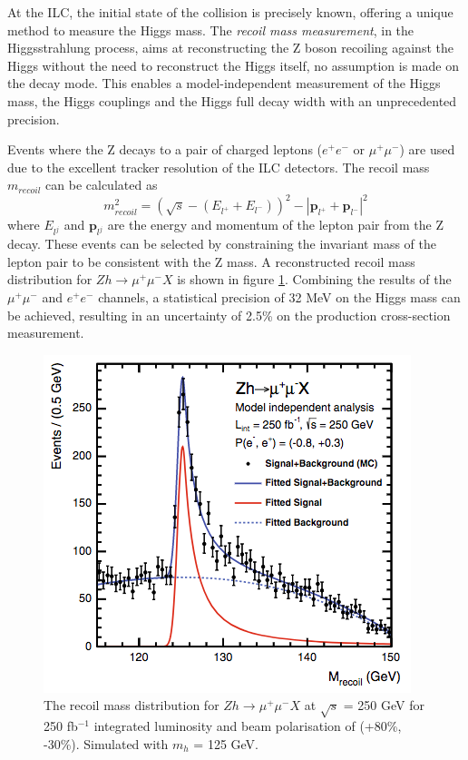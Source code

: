 At the ILC, the initial state of the collision is precisely known, offering a unique method to measure the Higgs mass. The \textit{recoil mass measurement}, in the Higgsstrahlung process, aims at reconstructing the Z boson recoiling against the Higgs without the need to reconstruct the Higgs itself, no assumption is made on the decay mode. This enables a model-independent measurement of the Higgs mass, the Higgs couplings and the Higgs full decay width with an unprecedented precision.

Events where the Z decays to a pair of charged leptons ($e^+e^-$ or $\mu^+ \mu^-$) are used due to the excellent tracker resolution of the ILC detectors. The recoil mass $m_{recoil}$ can be calculated as \cite{Yan:2016xyx}
\begin{equation}
  m_{recoil}^2 = (\sqrt{s} - (E_{l^+} + E_{l^-}))^2 -  |\textbf{p}_{l^+} + \textbf{p}_{l^-}|^2
\end{equation}
where $E_{l^j}$ and $\textbf{p}_{l^j}$ are the energy and momentum of the lepton pair from the Z decay. These events can be selected by constraining the invariant mass of the lepton pair to be consistent with the Z mass. A reconstructed recoil mass distribution for $Zh \rightarrow \mu^+\mu^-X$ is shown in figure \ref{fig:HiggsRecoilMuMu}. Combining the results of the $\mu^+\mu^-$ and $e^+e^-$ channels, a statistical precision of 32 MeV on the Higgs mass can be achieved, resulting in an uncertainty of 2.5\% on the production cross-section measurement.

\begin{figure}[htbp]
  \centering
  \includegraphics[width=0.5\linewidth]{chap2/fig/HiggsRecoilMuMu.png}
  \caption{The recoil mass distribution for $Zh \rightarrow \mu^+\mu^-X$ at $\sqrt{s}$ = 250 GeV for 250 fb$^{-1}$ integrated luminosity and beam polarisation of (+80\%, -30\%). Simulated with $m_h$ = 125 GeV. \cite{Thomson2016}} \label{fig:HiggsRecoilMuMu}
\end{figure}


